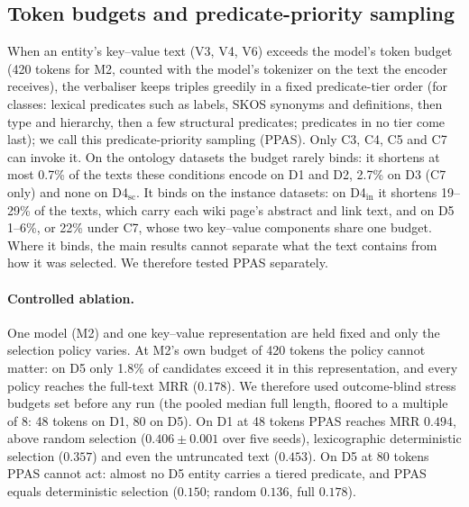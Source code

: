 
\subsection{Token budgets and predicate-priority sampling}
\label{sec:ppas}

When an entity's key--value text (V3, V4, V6) exceeds the model's token
budget (420 tokens for M2, counted with the model's tokenizer on the text
the encoder receives), the verbaliser keeps triples greedily in a fixed
predicate-tier order (for classes: lexical predicates such as labels, SKOS
synonyms and definitions, then type and hierarchy, then a few structural
predicates; predicates in no tier come last); we call this
predicate-priority sampling (PPAS). Only C3, C4, C5 and C7 can invoke it.
On the ontology datasets the budget rarely binds: it shortens at most
0.7\% of the texts these conditions encode on D1 and D2, 2.7\% on D3 (C7
only) and none on D4$_{\mathrm{sc}}$. It binds on the instance datasets:
on D4$_{\mathrm{in}}$ it shortens 19--29\% of the texts, which carry each
wiki page's abstract and link text, and on D5 1--6\%, or 22\% under C7,
whose two key--value components share one budget. Where it binds, the
main results cannot separate what the text contains from how it was
selected. We therefore tested PPAS separately.

\paragraph{Controlled ablation.}
One model (M2) and one key--value representation are held fixed and only the
selection policy varies. At M2's own budget of 420 tokens the policy cannot
matter: on D5 only 1.8\% of candidates exceed it in this representation, and
every policy reaches the full-text MRR ($0.178$). We therefore used
outcome-blind stress budgets set before any run (the pooled median full
length, floored to a multiple of 8: 48 tokens on D1, 80 on D5). On D1 at 48 tokens PPAS reaches MRR $0.494$, above random
selection ($0.406 \pm 0.001$ over five seeds), lexicographic deterministic
selection ($0.357$) and even the untruncated text ($0.453$). On D5 at 80
tokens PPAS cannot act: almost no D5 entity carries a tiered predicate, and
PPAS equals deterministic selection ($0.150$; random $0.136$, full $0.178$).

